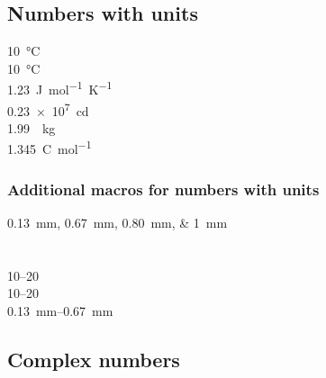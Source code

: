 \documentclass[12pt]{article}
\begin{document}
\subsection*{Numbers with units}
\qty{10}{\celsius} \\
\qty{10}{\degreeCelsius} \\
\qty{1.23}{J.mol^{-1}.K^{-1}} \\
\qty{.23e7}{\candela} \\
\qty[per-mode = symbol]{1.99}{\per\kilogram} \\
\qty[per-mode = fraction]{1,345}{\coulomb\per\mole}

\subsubsection*{Additional macros for numbers with units}
\qtylist{0.13;0.67;0.80;1}{\milli\metre}\\
 \\
 \\
\numrange{10}{20} \\
\numrange[range-phrase=--]{10}{20} \\
\qtyrange{0.13}{0.67}{\milli\metre} \\

\subsection*{Complex numbers}

\clearpage
\end{document}
